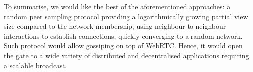 
To summarise, we would like the best of the aforementioned approaches: a random
peer sampling protocol providing a logarithmically growing partial view size
compared to the network membership, using neighbour-to-neighbour interactions
to establish connections, quickly converging to a random network. Such protocol
would allow gossiping on top of WebRTC. Hence, it would open the gate to a wide
variety of distributed and decentralised applications requiring a scalable
broadcast.

